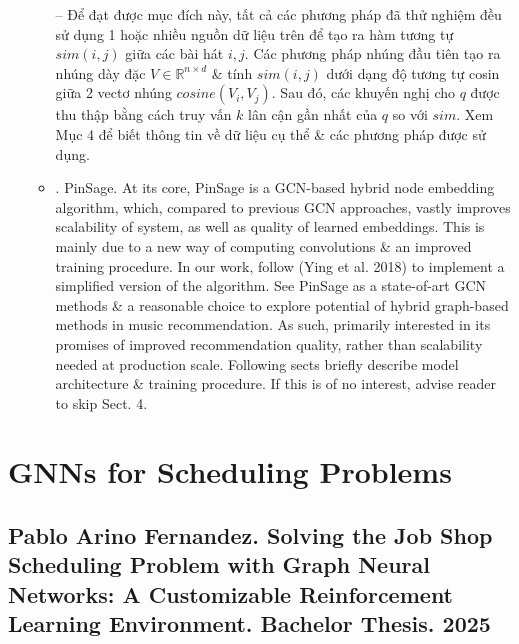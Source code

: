 \documentclass{article}
\begin{document}
\begin{itemize}
\begin{itemize}
        -- Để đạt được mục đích này, tất cả các phương pháp đã thử nghiệm đều sử dụng 1 hoặc nhiều nguồn dữ liệu trên để tạo ra hàm tương tự $sim(i,j)$ giữa các bài hát $i,j$. Các phương pháp nhúng đầu tiên tạo ra nhúng dày đặc $V\in\mathbb{R}^{n\times d}$ \& tính $sim(i,j)$ dưới dạng độ tương tự cosin giữa 2 vectơ nhúng $cosine(V_i,V_j)$. Sau đó, các khuyến nghị cho $q$ được thu thập bằng cách truy vấn $k$ lân cận gần nhất của $q$ so với $sim$. Xem Mục 4 để biết thông tin về dữ liệu cụ thể \& các phương pháp được sử dụng.
        \item {. PinSage.} At its core, PinSage is a GCN-based hybrid node embedding algorithm, which, compared to previous GCN approaches, vastly improves scalability of system, as well as quality of learned embeddings. This is mainly due to a new way of computing convolutions \& an improved training procedure. In our work, follow (Ying et al. 2018) to implement a simplified version of the algorithm. See PinSage as a state-of-art GCN methods \& a reasonable choice to explore potential of hybrid graph-based methods in music recommendation. As such, primarily interested in its promises of improved recommendation quality, rather than scalability needed at production scale. Following sects briefly describe model architecture \& training procedure. If this is of no interest, advise reader to skip Sect. 4.
    \end{itemize}
\end{itemize}


\section{GNNs for Scheduling Problems}


\subsection{{\sc Pablo Arino Fernandez}. Solving the Job Shop Scheduling Problem with Graph Neural Networks: A Customizable Reinforcement Learning Environment. Bachelor Thesis. 2025}
\end{document}
